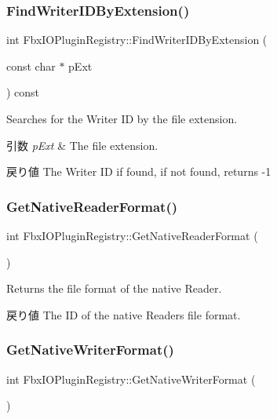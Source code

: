 \subsubsection{\texorpdfstring{Find\+Writer\+I\+D\+By\+Extension()}{FindWriterIDByExtension()}}
{\footnotesize\ttfamily int Fbx\+I\+O\+Plugin\+Registry\+::\+Find\+Writer\+I\+D\+By\+Extension (\begin{DoxyParamCaption}\item[{const char $\ast$}]{p\+Ext }\end{DoxyParamCaption}) const}

Searches for the Writer ID by the file extension. 
\begin{DoxyParams}{引数}
{\em p\+Ext} & The file extension. \\
\hline
\end{DoxyParams}
\begin{DoxyReturn}{戻り値}
The Writer ID if found, if not found, returns -\/1 
\end{DoxyReturn}
\mbox{\label{class_fbx_i_o_plugin_registry_a327774f480239422e9fb51a15eee99ce}} 
\subsubsection{\texorpdfstring{Get\+Native\+Reader\+Format()}{GetNativeReaderFormat()}}
{\footnotesize\ttfamily int Fbx\+I\+O\+Plugin\+Registry\+::\+Get\+Native\+Reader\+Format (\begin{DoxyParamCaption}{ }\end{DoxyParamCaption})}

Returns the file format of the native Reader. \begin{DoxyReturn}{戻り値}
The ID of the native Reader\textquotesingle{}s file format. 
\end{DoxyReturn}
\mbox{\label{class_fbx_i_o_plugin_registry_a846db4ae58c80f28d8fd48c6af93ea3e}} 
\subsubsection{\texorpdfstring{Get\+Native\+Writer\+Format()}{GetNativeWriterFormat()}}
{\footnotesize\ttfamily int Fbx\+I\+O\+Plugin\+Registry\+::\+Get\+Native\+Writer\+Format (\begin{DoxyParamCaption}{ }\end{DoxyParamCaption})}

